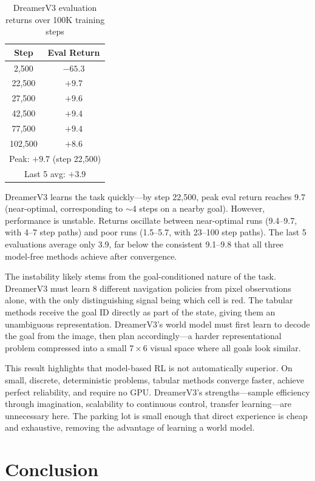 \documentclass[letterpaper]{article}
\begin{document}
\begin{table}[H]
\centering
\caption{DreamerV3 evaluation returns over 100K training steps}
\label{tab:dreamer}
\begin{tabular}{@{}cc@{}}
\toprule
Step & Eval Return \\
\midrule
2,500  & $-65.3$ \\
22,500 & $+9.7$ \\
27,500 & $+9.6$ \\
42,500 & $+9.4$ \\
77,500 & $+9.4$ \\
102,500 & $+8.6$ \\
\midrule
\multicolumn{2}{c}{Peak: $+9.7$ (step 22,500)} \\
\multicolumn{2}{c}{Last 5 avg: $+3.9$} \\
\bottomrule
\end{tabular}
\end{table}

DreamerV3 learns the task quickly---by step 22,500, peak eval return reaches 9.7 (near-optimal, corresponding to $\sim$4 steps on a nearby goal). However, performance is unstable. Returns oscillate between near-optimal runs (9.4--9.7, with 4--7 step paths) and poor runs (1.5--5.7, with 23--100 step paths). The last 5 evaluations average only 3.9, far below the consistent 9.1--9.8 that all three model-free methods achieve after convergence.

The instability likely stems from the goal-conditioned nature of the task. DreamerV3 must learn 8 different navigation policies from pixel observations alone, with the only distinguishing signal being which cell is red. The tabular methods receive the goal ID directly as part of the state, giving them an unambiguous representation. DreamerV3's world model must first learn to decode the goal from the image, then plan accordingly---a harder representational problem compressed into a small $7 \times 6$ visual space where all goals look similar.

This result highlights that model-based RL is not automatically superior. On small, discrete, deterministic problems, tabular methods converge faster, achieve perfect reliability, and require no GPU. DreamerV3's strengths---sample efficiency through imagination, scalability to continuous control, transfer learning---are unnecessary here. The parking lot is small enough that direct experience is cheap and exhaustive, removing the advantage of learning a world model.


\section{Conclusion}
\end{document}
